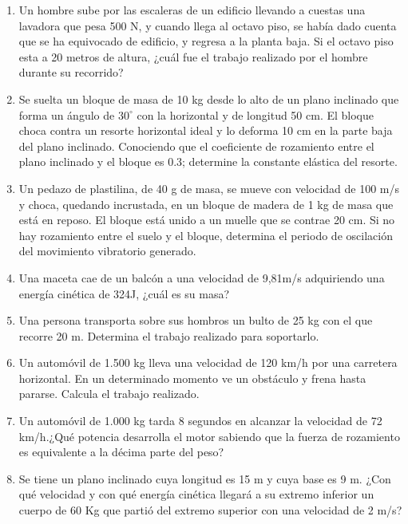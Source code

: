 \documentclass[a5paper,pagesize,10pt,bibtotoc,pointlessnumbers,
normalheadings,DIV=9,fleqn,x11names,table,twoside=false]{scrbook}
\begin{document}
\begin{enumerate}

\item Un hombre sube por las escaleras de un edificio llevando a cuestas una lavadora que pesa 500 N, y cuando llega al octavo 
piso, se había dado cuenta que se ha equivocado de edificio, y regresa a la planta baja. Si el octavo piso esta a 20 metros de 
altura, ¿cuál fue el trabajo realizado por el hombre durante su recorrido?

\item Se suelta un bloque de masa de 10 kg desde lo alto de un plano inclinado que forma un ángulo de $30^\circ$ con la
horizontal y de longitud 50 cm. El bloque choca contra un resorte horizontal ideal y lo deforma 10 cm en la parte baja del plano 
inclinado. Conociendo que el coeficiente de rozamiento entre el plano inclinado y el bloque es 0.3; determine la constante 
elástica del resorte.

\item Un pedazo de plastilina, de 40 g de masa, se mueve con velocidad de 100 m/s y choca, quedando incrustada, en un bloque de 
madera de 1 kg de masa que está en reposo. El bloque está unido a un muelle que se contrae 20 cm. Si no hay rozamiento entre 
el suelo y el bloque, determina el periodo de oscilación del movimiento vibratorio generado.

\item Una maceta cae de un balcón a una velocidad de 9,81m/s adquiriendo una energía cinética de 324J, ¿cuál es su masa?  

\item Una persona transporta sobre sus hombros un bulto de 25 kg con el que recorre 20 m. Determina el trabajo realizado para 
soportarlo. 

\item Un automóvil de 1.500 kg lleva una velocidad de 120 km/h por una carretera horizontal. En un determinado momento ve un 
obstáculo y frena hasta pararse. Calcula el trabajo realizado.

\item Un automóvil de 1.000 kg tarda 8 segundos en alcanzar la velocidad de 72 km/h.¿Qué potencia desarrolla el motor sabiendo que 
la fuerza de rozamiento es equivalente a la décima parte del peso? 

\item Se tiene un plano inclinado cuya longitud es 15 m y cuya base es 9 m. ¿Con qué velocidad y con qué energía cinética  llegará 
a su extremo inferior un cuerpo de 60 Kg que partió del extremo superior con una velocidad de 2 m/s? 


\end{enumerate}
\end{document}
